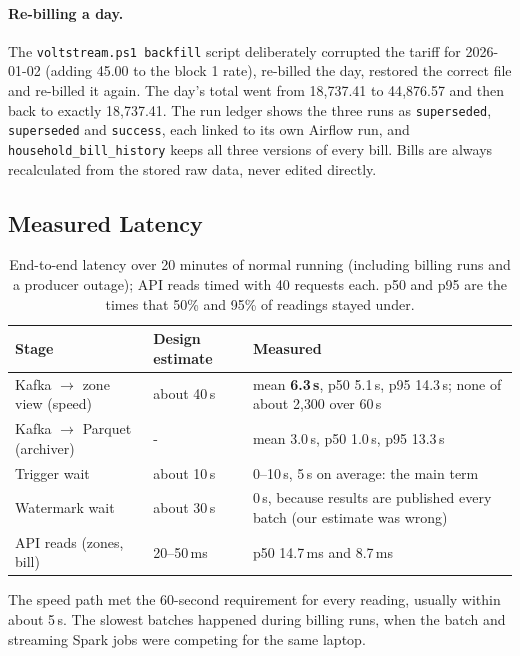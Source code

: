 \documentclass[11pt,a4paper]{article}
\begin{document}
\paragraph{Re-billing a day.} The \texttt{voltstream.ps1 backfill} script deliberately
corrupted the tariff for 2026-01-02 (adding 45.00 to the block 1 rate), re-billed the day,
restored the correct file and re-billed it again. The day's total went from 18{,}737.41 to
44{,}876.57 and then back to exactly 18{,}737.41. The run ledger shows the three runs as
\texttt{superseded}, \texttt{superseded} and \texttt{success}, each linked to its own Airflow
run, and \texttt{household\_bill\_history} keeps all three versions of every bill. Bills are
always recalculated from the stored raw data, never edited directly.

\subsection{Measured Latency}
\label{sec:res-latency}

\begin{table}[!htbp]
\centering
\caption{End-to-end latency over 20 minutes of normal running (including billing runs and a
producer outage); API reads timed with 40 requests each. p50 and p95 are the times that 50\% and 95\% of readings stayed under.}
\label{tab:latency}
\small
\begin{tabularx}{\textwidth}{L{4.8cm} L{2.6cm} X}
\toprule
\textbf{Stage} & \textbf{Design estimate} & \textbf{Measured} \\
\midrule
Kafka $\rightarrow$ zone view (speed) & about 40\,s & mean \textbf{6.3\,s}, p50 5.1\,s, p95 14.3\,s; none of about 2{,}300 over 60\,s \\
Kafka $\rightarrow$ Parquet (archiver) & - & mean 3.0\,s, p50 1.0\,s, p95 13.3\,s \\
Trigger wait & about 10\,s & 0--10\,s, 5\,s on average: the main term \\
Watermark wait & about 30\,s & 0\,s, because results are published every batch (our estimate was wrong) \\
API reads (zones, bill) & 20--50\,ms & p50 14.7\,ms and 8.7\,ms \\
\bottomrule
\end{tabularx}
\end{table}

The speed path met the 60-second requirement for every reading, usually within about 5\,s.
The slowest batches happened during billing runs, when the batch and streaming Spark jobs
were competing for the same laptop.
\end{document}
